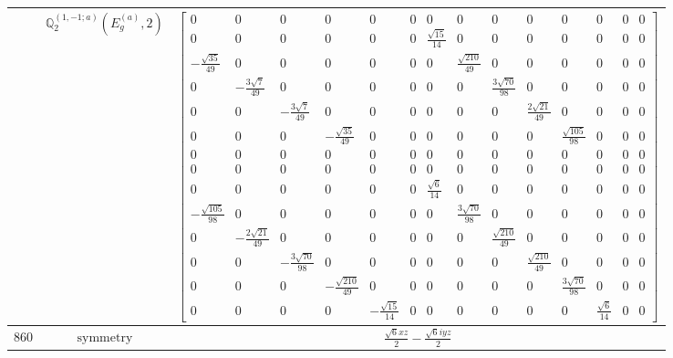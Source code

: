 \documentclass[fleqn,8pt,landscape]{jsarticle}
\begin{document}
\begin{longtable}{ccc}
$  $ & $ \mathbb{Q}_{2}^{(1,-1;a)}(E_{g}^{(a)},2) $ & $ \begin{bmatrix} 0 & 0 & 0 & 0 & 0 & 0 & 0 & 0 & 0 & 0 & 0 & 0 & 0 & 0 \\ 0 & 0 & 0 & 0 & 0 & 0 & \frac{\sqrt{15}}{14} & 0 & 0 & 0 & 0 & 0 & 0 & 0 \\ - \frac{\sqrt{35}}{49} & 0 & 0 & 0 & 0 & 0 & 0 & \frac{\sqrt{210}}{49} & 0 & 0 & 0 & 0 & 0 & 0 \\ 0 & - \frac{3 \sqrt{7}}{49} & 0 & 0 & 0 & 0 & 0 & 0 & \frac{3 \sqrt{70}}{98} & 0 & 0 & 0 & 0 & 0 \\ 0 & 0 & - \frac{3 \sqrt{7}}{49} & 0 & 0 & 0 & 0 & 0 & 0 & \frac{2 \sqrt{21}}{49} & 0 & 0 & 0 & 0 \\ 0 & 0 & 0 & - \frac{\sqrt{35}}{49} & 0 & 0 & 0 & 0 & 0 & 0 & \frac{\sqrt{105}}{98} & 0 & 0 & 0 \\ 0 & 0 & 0 & 0 & 0 & 0 & 0 & 0 & 0 & 0 & 0 & 0 & 0 & 0 \\ 0 & 0 & 0 & 0 & 0 & 0 & 0 & 0 & 0 & 0 & 0 & 0 & 0 & 0 \\ 0 & 0 & 0 & 0 & 0 & 0 & \frac{\sqrt{6}}{14} & 0 & 0 & 0 & 0 & 0 & 0 & 0 \\ - \frac{\sqrt{105}}{98} & 0 & 0 & 0 & 0 & 0 & 0 & \frac{3 \sqrt{70}}{98} & 0 & 0 & 0 & 0 & 0 & 0 \\ 0 & - \frac{2 \sqrt{21}}{49} & 0 & 0 & 0 & 0 & 0 & 0 & \frac{\sqrt{210}}{49} & 0 & 0 & 0 & 0 & 0 \\ 0 & 0 & - \frac{3 \sqrt{70}}{98} & 0 & 0 & 0 & 0 & 0 & 0 & \frac{\sqrt{210}}{49} & 0 & 0 & 0 & 0 \\ 0 & 0 & 0 & - \frac{\sqrt{210}}{49} & 0 & 0 & 0 & 0 & 0 & 0 & \frac{3 \sqrt{70}}{98} & 0 & 0 & 0 \\ 0 & 0 & 0 & 0 & - \frac{\sqrt{15}}{14} & 0 & 0 & 0 & 0 & 0 & 0 & \frac{\sqrt{6}}{14} & 0 & 0 \end{bmatrix} $ \\ \hline
$ 860 $ & $ \text{symmetry} $ & $ \frac{\sqrt{6} x z}{2} - \frac{\sqrt{6} i y z}{2} $ \\

\end{longtable}
\end{document}
